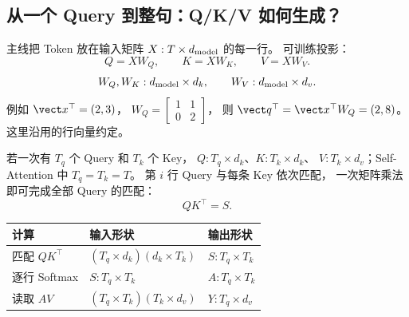 \subsection{从一个 Query 到整句：Q/K/V 如何生成？}
主线把 Token 放在输入矩阵 $X:T\times d_{\rm model}$ 的每一行。
可训练投影：
\begin{equation}
\boxed{Q=XW_Q,\qquad K=XW_K,\qquad V=XW_V.}
\label{eq:qkv-from-x}
\end{equation}
\[
W_Q,W_K:d_{\rm model}\times d_k,\qquad
W_V:d_{\rm model}\times d_v.
\]
例如 $\vect x^\top=(2,3)$，
$W_Q=\begin{bmatrix}1&1\\0&2\end{bmatrix}$，
则 $\vect q^\top=\vect x^\top W_Q=(2,8)$。
这里沿用的行向量约定。

若一次有 $T_q$ 个 Query 和 $T_k$ 个 Key，
$Q:T_q\times d_k$、$K:T_k\times d_k$、
$V:T_k\times d_v$；Self-Attention 中 $T_q=T_k=T$。
第 $i$ 行 Query 与每条 Key 依次匹配，
一次矩阵乘法即可完成全部 Query 的匹配：
\[
QK^\top=S.
\]
\begin{center}\small
{}
\begin{tabular}{@{}lll@{}}
\toprule
计算 & 输入形状 & 输出形状\\\midrule
匹配 $QK^\top$ & $(T_q\times d_k)(d_k\times T_k)$ & $S:T_q\times T_k$\\
逐行 Softmax & $S:T_q\times T_k$ & $A:T_q\times T_k$\\
读取 $AV$ & $(T_q\times T_k)(T_k\times d_v)$ & $Y:T_q\times d_v$\\
\bottomrule
\end{tabular}
\end{center}


